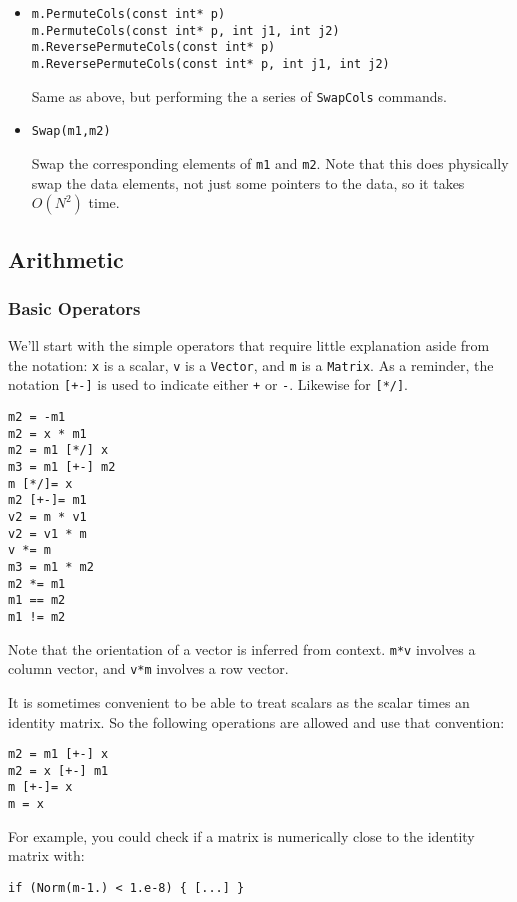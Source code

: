 \documentclass[twoside,letterpaper,11pt]{article}
\renewcommand{\tt}[1]{{\texttt {#1}}}
\begin{document}
\begin{itemize}
\item
\begin{verbatim}
m.PermuteCols(const int* p)
m.PermuteCols(const int* p, int j1, int j2)
m.ReversePermuteCols(const int* p)
m.ReversePermuteCols(const int* p, int j1, int j2)
\end{verbatim}
Same as above, but performing the a series of \tt{SwapCols} commands.

\item
\begin{verbatim}
Swap(m1,m2)
\end{verbatim}
Swap the corresponding elements of \tt{m1} and \tt{m2}.  Note that this does physically
swap the data elements, not just some pointers to the data, so it takes $O(N^2)$ time.

\end{itemize}

\subsection{Arithmetic}

\subsubsection{Basic Operators}

We'll start with the simple operators that require little explanation aside from the 
notation: 
\tt{x} is a scalar, \tt{v} is a \tt{Vector}, and \tt{m} is a \tt{Matrix}.  As a reminder,
the notation \tt{[+-]} is used to indicate either \tt{+} or \tt{-}.  Likewise for \tt{[*/]}.
\begin{verbatim}
m2 = -m1
m2 = x * m1
m2 = m1 [*/] x
m3 = m1 [+-] m2
m [*/]= x
m2 [+-]= m1
v2 = m * v1
v2 = v1 * m
v *= m
m3 = m1 * m2
m2 *= m1
m1 == m2
m1 != m2
\end{verbatim}

Note that the orientation of a vector is inferred from context.  \tt{m*v} involves a 
column vector, and \tt{v*m} involves a row vector.

It is sometimes convenient to be able to treat scalars as the scalar times an
identity matrix.  So the following operations are allowed and use that convention:
\begin{verbatim}
m2 = m1 [+-] x
m2 = x [+-] m1
m [+-]= x
m = x
\end{verbatim}
For example, you could check if a matrix is numerically close to the identity matrix 
with:
\begin{verbatim}
if (Norm(m-1.) < 1.e-8) { [...] }
\end{verbatim}
\end{document}
